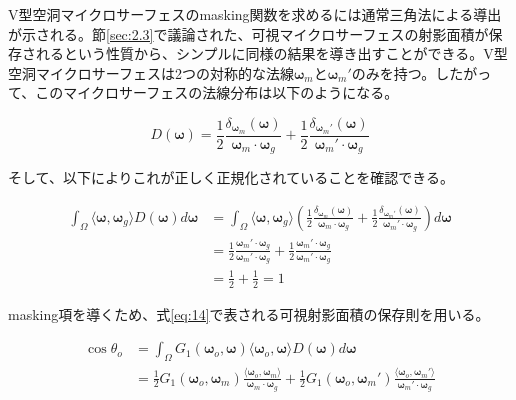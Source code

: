 \documentclass[a4j,xelatex,ja=standard]{bxjsarticle}
\begin{document}
V型空洞マイクロサーフェスのmasking関数を求めるには通常三角法による導出が示される。節\ref{sec:2.3}で議論された、可視マイクロサーフェスの射影面積が保存されるという性質から、シンプルに同様の結果を導き出すことができる。V型空洞マイクロサーフェスは2つの対称的な法線$\boldsymbol{\omega}_m$と$\boldsymbol{\omega}_m'$のみを持つ。したがって、このマイクロサーフェスの法線分布は以下のようになる。

\begin{equation}
    D(\boldsymbol{\omega}) = \frac{1}{2} \frac{\delta_{\boldsymbol{\omega}_m}(\boldsymbol{\omega})}{\boldsymbol{\omega}_m \cdot \boldsymbol{\omega}_g} + \frac{1}{2} \frac{\delta_{\boldsymbol{\omega}_m'}(\boldsymbol{\omega})}{\boldsymbol{\omega}_m' \cdot \boldsymbol{\omega}_g}
    \label{eq:44}
\end{equation}

そして、以下によりこれが正しく正規化されていることを確認できる。

\begin{equation}
    \begin{split}
        \int_{\Omega} \langle \boldsymbol{\omega}, \boldsymbol{\omega}_g \rangle D(\boldsymbol{\omega}) d\boldsymbol{\omega}
        &= \int_{\Omega} \langle \boldsymbol{\omega}, \boldsymbol{\omega}_g \rangle \left( \frac{1}{2} \frac{\delta_{\boldsymbol{\omega}_m}(\boldsymbol{\omega})}{\boldsymbol{\omega}_m \cdot \boldsymbol{\omega}_g} + \frac{1}{2} \frac{\delta_{\boldsymbol{\omega}_m'}(\boldsymbol{\omega})}{\boldsymbol{\omega}_m' \cdot \boldsymbol{\omega}_g} \right) d\boldsymbol{\omega} \\
        &= \frac{1}{2} \frac{\boldsymbol{\omega}_m' \cdot \boldsymbol{\omega}_g}{\boldsymbol{\omega}_m' \cdot \boldsymbol{\omega}_g} + \frac{1}{2} \frac{\boldsymbol{\omega}_m' \cdot \boldsymbol{\omega}_g}{\boldsymbol{\omega}_m' \cdot \boldsymbol{\omega}_g} \\
        &= \frac{1}{2} + \frac{1}{2} = 1
    \end{split}
    \label{eq:45}
\end{equation}

masking項を導くため、式\eqref{eq:14}で表される可視射影面積の保存則を用いる。

\begin{equation}
    \begin{split}
        \cos\theta_o
        &= \int_{\Omega} G_1(\boldsymbol{\omega}_o, \boldsymbol{\omega}) \langle \boldsymbol{\omega}_o, \boldsymbol{\omega} \rangle D(\boldsymbol{\omega}) d\boldsymbol{\omega} \\
        &= \frac{1}{2} G_1(\boldsymbol{\omega}_o, \boldsymbol{\omega}_m) \frac{\langle \boldsymbol{\omega}_o, \boldsymbol{\omega}_m \rangle}{\boldsymbol{\omega}_m \cdot \boldsymbol{\omega}_g} + \frac{1}{2} G_1(\boldsymbol{\omega}_o, \boldsymbol{\omega}_m') \frac{\langle \boldsymbol{\omega}_o, \boldsymbol{\omega}_m' \rangle}{\boldsymbol{\omega}_m' \cdot \boldsymbol{\omega}_g}
    \end{split}
    \label{eq:46}
\end{equation}
\end{document}
